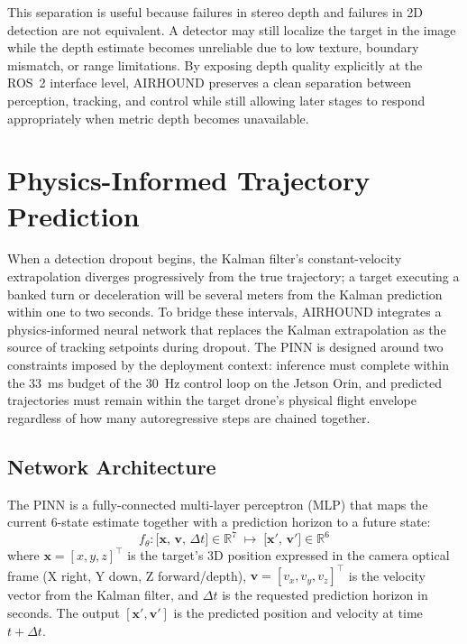 \documentclass[11pt,letterpaper]{article}
\begin{document}
This separation is useful because failures in stereo depth and failures in 2D detection are not equivalent. A detector may still localize the target in the image while the depth estimate becomes unreliable due to low texture, boundary mismatch, or range limitations. By exposing depth quality explicitly at the ROS~2 interface level, AIRHOUND preserves a clean separation between perception, tracking, and control while still allowing later stages to respond appropriately when metric depth becomes unavailable.


\section{Physics-Informed Trajectory Prediction}
\label{sec:pinn}

When a detection dropout begins, the Kalman filter's constant-velocity
extrapolation diverges progressively from the true trajectory; a target
executing a banked turn or deceleration will be several meters from the
Kalman prediction within one to two seconds. To bridge these intervals, AIRHOUND
integrates a physics-informed neural network that replaces the Kalman
extrapolation as the source of tracking setpoints during dropout.
The PINN is designed around two constraints imposed by the deployment context:
inference must complete within the 33~ms budget of the 30~Hz control loop on
the Jetson Orin, and predicted trajectories must remain within the target
drone's physical flight envelope regardless of how many autoregressive steps
are chained together.

\subsection{Network Architecture}
\label{sec:pinn_arch}

The PINN is a fully-connected multi-layer perceptron (MLP) that maps the
current 6-state estimate together with a prediction horizon to a future
state:
\begin{equation}
    f_\theta : \bigl[\mathbf{x},\,\mathbf{v},\,\Delta t\bigr] \in \mathbb{R}^7
               \;\mapsto\;
               \bigl[\mathbf{x}',\,\mathbf{v}'\bigr] \in \mathbb{R}^6
\end{equation}
where $\mathbf{x} = [x,y,z]^\top$ is the target's 3D position expressed in the
camera optical frame (X right, Y down, Z forward/depth), $\mathbf{v} =
[v_x,v_y,v_z]^\top$ is the velocity vector from the Kalman filter, and $\Delta
t$ is the requested prediction horizon in seconds.
The output $[\mathbf{x}',\mathbf{v}']$ is the predicted position and velocity
at time $t + \Delta t$.
\end{document}
